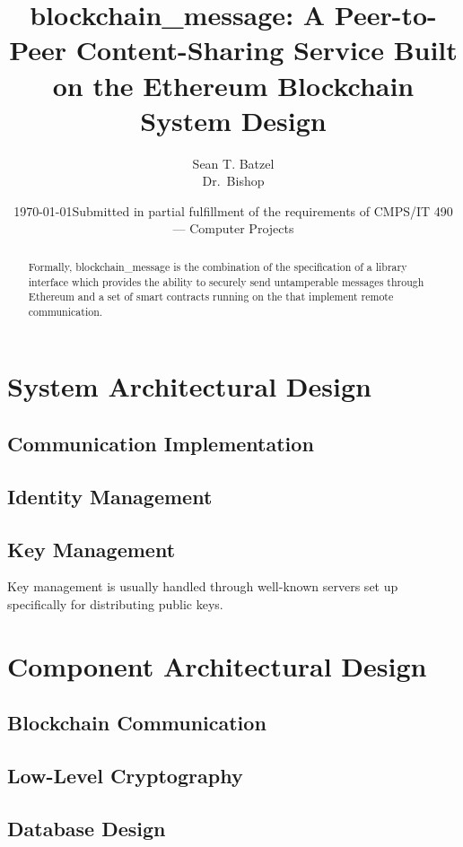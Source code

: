 \documentclass[titlepage]{report}
\title{blockchain\_message: A Peer-to-Peer Content-Sharing Service Built on the Ethereum Blockchain\\\large System Design}
\author{Sean T. Batzel\\Dr.\ Bishop}
\date{\today\endgraf\bigskip Submitted in partial fulfillment of the requirements of CMPS/IT 490 --- Computer Projects}
\begin{document}
\maketitle

\tableofcontents

\nocite{*}

\begin{abstract}
    Formally, blockchain\_message is the combination of the specification of a library interface which provides the ability to securely send untamperable messages through \gls{Ethereum} and a set of smart contracts running on the  that implement remote communication.
\end{abstract}

\section{System Architectural Design}

\subsection{Communication Implementation}

\subsection{Identity Management}

\subsection{Key Management}
Key management is usually handled through well-known servers set up specifically for distributing public keys.

\section{Component Architectural Design}

\subsection{Blockchain Communication}

\subsection{Low-Level Cryptography}

\subsection{Database Design}
\end{document}
